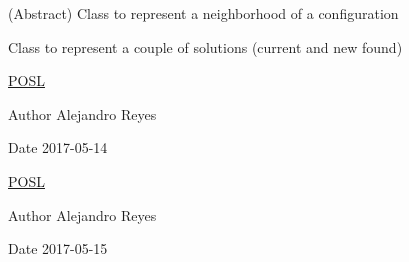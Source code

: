 (Abstract) Class to represent a neighborhood of a configuration

Class to represent a couple of solutions (current and new found)

\hyperlink{namespacePOSL}{P\+O\+SL}

\begin{DoxyAuthor}{Author}
Alejandro Reyes 
\end{DoxyAuthor}
\begin{DoxyDate}{Date}
2017-\/05-\/14
\end{DoxyDate}
\hyperlink{namespacePOSL}{P\+O\+SL}

\begin{DoxyAuthor}{Author}
Alejandro Reyes 
\end{DoxyAuthor}
\begin{DoxyDate}{Date}
2017-\/05-\/15 
\end{DoxyDate}
